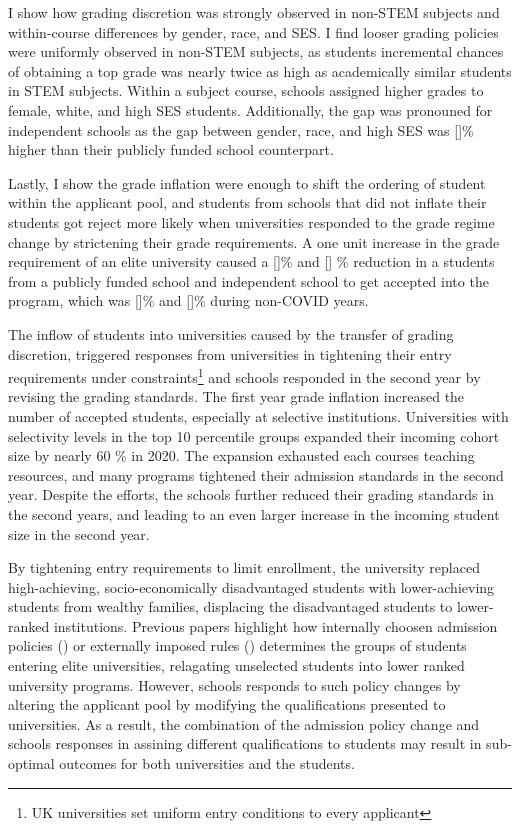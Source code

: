I show how grading discretion was strongly observed in non-STEM subjects and within-course differences by gender, race, and SES.  I find looser grading policies were uniformly observed in non-STEM subjects, as students incremental chances of obtaining a top grade was nearly twice as high as academically similar students in STEM subjects. Within a subject course, schools assigned higher grades to female, white, and high SES students. Additionally, the gap was pronouned for independent schools as the gap between gender, race, and high SES was []\% higher than their publicly funded school counterpart. 

Lastly, I show the grade inflation were enough to shift the ordering of student within the applicant pool, and students from schools that did not inflate their students got reject more likely when universities responded to the grade regime change by strictening their grade requirements. A one unit increase in the grade requirement of an elite university caused a []\% and [] \% reduction in a students from a publicly funded school and independent school to get accepted into the program, which was []\% and []\% during non-COVID years. 

The inflow of students into universities caused by the transfer of grading discretion, triggered responses from universities in tightening their entry requirements under constraints\footnote{UK universities set uniform entry conditions to every applicant} and schools responded in the second year by revising the grading standards. The first year grade inflation increased the number of accepted students, especially at selective institutions. Universities with selectivity levels in the top 10 percentile groups expanded their incoming cohort size by nearly 60 \% in 2020. The expansion exhausted each courses teaching resources, and many programs tightened their admission standards in the second year. Despite the efforts, the schools further reduced their grading standards in the second years, and leading to an even larger increase in the incoming student size in the second year. 

By tightening entry requirements to limit enrollment, the university replaced high-achieving, socio-economically disadvantaged students with lower-achieving students from wealthy families, displacing the disadvantaged students to lower-ranked institutions. Previous papers highlight
how internally choosen admission policies (\cite{Chetty2023}) or externally imposed rules (\cite{BLEEMER2023104839}) determines the groups of students entering elite universities, relagating unselected students into lower ranked university programs. However, schools responds to such policy changes by altering the applicant pool by modifying the qualifications presented to universities. As a result, the combination of the admission policy change and schools responses in assining different qualifications to students may result in sub-optimal outcomes for both universities and the students. 

